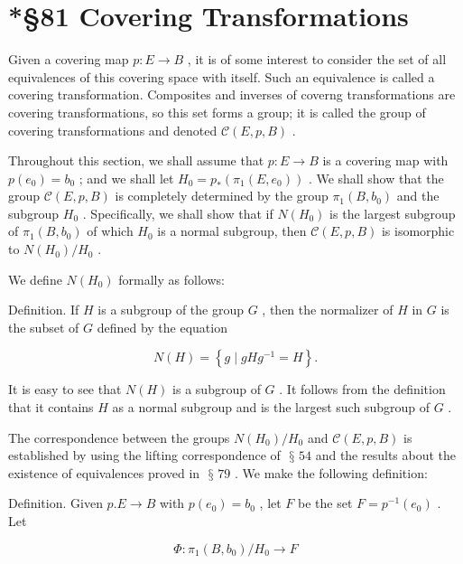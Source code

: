 \documentclass[10pt]{article}
\begin{document}
\section*{*§81 Covering Transformations}

Given a covering map \(p : E \rightarrow  B\) , it is of some interest to consider the set of all equivalences of this covering space with itself. Such an equivalence is called a covering transformation. Composites and inverses of coverng transformations are covering transformations, so this set forms a group; it is called the group of covering transformations and denoted \(\mathcal{C}\left( {E,p,B}\right)\) .

Throughout this section, we shall assume that \(p : E \rightarrow  B\) is a covering map with \(p\left( {e}_{0}\right)  = {b}_{0}\) ; and we shall let \({H}_{0} = {p}_{ * }\left( {{\pi }_{1}\left( {E,{e}_{0}}\right) }\right)\) . We shall show that the group \(\mathcal{C}\left( {E,p,B}\right)\) is completely determined by the group \({\pi }_{1}\left( {B,{b}_{0}}\right)\) and the subgroup \({H}_{0}\) . Specifically, we shall show that if \(N\left( {H}_{0}\right)\) is the largest subgroup of \({\pi }_{1}\left( {B,{b}_{0}}\right)\) of which \({H}_{0}\) is a normal subgroup, then \(\mathcal{C}\left( {E,p,B}\right)\) is isomorphic to \(N\left( {H}_{0}\right) /{H}_{0}\) .

We define \(N\left( {H}_{0}\right)\) formally as follows:

Definition. If \(H\) is a subgroup of the group \(G\) , then the normalizer of \(H\) in \(G\) is the subset of \(G\) defined by the equation

\[
N\left( H\right)  = \left\{  {g \mid  {gH}{g}^{-1} = H}\right\}  .
\]

It is easy to see that \(N\left( H\right)\) is a subgroup of \(G\) . It follows from the definition that it contains \(H\) as a normal subgroup and is the largest such subgroup of \(G\) .

The correspondence between the groups \(N\left( {H}_{0}\right) /{H}_{0}\) and \(\mathcal{C}\left( {E,p,B}\right)\) is established by using the lifting correspondence of \(\text{ § }{54}\) and the results about the existence of equivalences proved in \(\text{ § }{79}\) . We make the following definition:

Definition. Given \(p.E \rightarrow  B\) with \(p\left( {e}_{0}\right)  = {b}_{0}\) , let \(F\) be the set \(F = {p}^{-1}\left( {e}_{0}\right)\) . Let

\[
\Phi  : {\pi }_{1}\left( {B,{b}_{0}}\right) /{H}_{0} \rightarrow  F
\]
\end{document}
